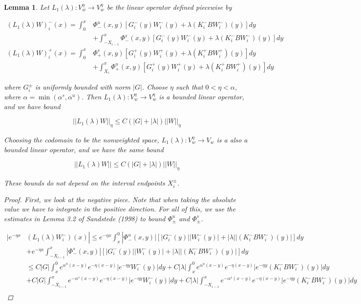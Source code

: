 \documentclass[12pt]{article}
\newtheorem{lemma}{Lemma}
\begin{document}
\begin{lemma}

Let $L_1(\lambda): V_w^\eta \rightarrow V_w^\eta$ be the linear operator defined piecewise by

\begin{align*}
(L_1(\lambda)W)_i^-(x) = \int_0^x &\Phi^u_-(x, y)[G_i^-(y) W_i^-(y) + \lambda (K_i^- B W_i^-)(y) ] dy \\
&+ \int_{-X_{i-1}}^x \Phi^s_-(x, y)[G_i^-(y) W_i^-(y) + \lambda (K_i^-B W_i^-)(y) ] dy \\
(L_1(\lambda)W)_i^+(x) = \int_0^x &\Phi^s_+(x, y)[G_i^+(y) W_i^+(y) + \lambda (K_i^+ B W_i^+)(y)] dy \\
&+ \int_{X_{i}}^x \Phi^u_+(x, y)[G_i^+(y) W_i^+(y) + \lambda (K_i^+ B W_i^+)(y) ] dy
\end{align*}

where $G_i^\pm$ is uniformly bounded with norm $|G|$. Choose $\eta$ such that $0 < \eta < \alpha$, where $\alpha = \min(\alpha^s, \alpha^u)$. Then $L_1(\lambda): V_w^\eta \rightarrow V_w^\eta$ is a bounded linear operator, and we have bound

\begin{equation}
||L_1(\lambda)W||_\eta \leq C\left(|G| +|\lambda|\right)||W||_\eta
\end{equation}

Choosing the codomain to be the nonweighted space, $L_1(\lambda): V_w^\eta \rightarrow V_w$ is a also a bounded linear operator, and we have the same bound

\begin{equation}
||L_1(\lambda)W|| \leq C\left(|G| +|\lambda|\right)||W||_\eta
\end{equation}

These bounds do not depend on the interval endpoints $X_i^\pm$.\\

\begin{proof}
First, we look at the negative piece. Note that when taking the absolute value we have to integrate in the positive direction. For all of this, we use the estimates in Lemma 3.2 of Sandstede (1998) to bound $\Phi^u_\pm$ and $\Phi^s_\pm$.

\begin{align*}
|e^{-\eta x} & (L_1(\lambda)W_i^-)(x) | \leq  e^{-\eta x} \int_x^0 |\Phi^u_-(x, y)|[|G_i^-(y)||W_i^-(y)| + |\lambda||(K_i^- B W_i^-)(y)| ] dy \\
&+ e^{-\eta x} \int_{-X_{i-1}}^x |\Phi^s_-(x, y)|[|G_i^-(y)||W_i^-(y)| + |\lambda||(K_i^- B W_i^-)(y)| ] dy \\
&\leq C|G| \int_x^0 e^{\alpha^u (x-y)}e^{-\eta(x-y)}|e^{-\eta y} W_i^-(y)| dy 
+ C|\lambda|\int_x^0 e^{\alpha^u (x-y)}e^{-\eta(x-y)}|e^{-\eta y} (K_i^- B W_i^-)(y)| dy \\
&+ C|G| \int_{-X_{i-1}}^x e^{-\alpha^s (x-y)}e^{-\eta(x-y)}|e^{-\eta y} W_i^-(y)| dy 
+ C|\lambda|\int_{-X_{i-1}}^x e^{-\alpha^s (x-y)}e^{-\eta(x-y)}|e^{-\eta y} (K_i^- B W_i^-)(y)| dy  \\ 
\end{align*}


\end{proof}
\end{lemma}
\end{document}

